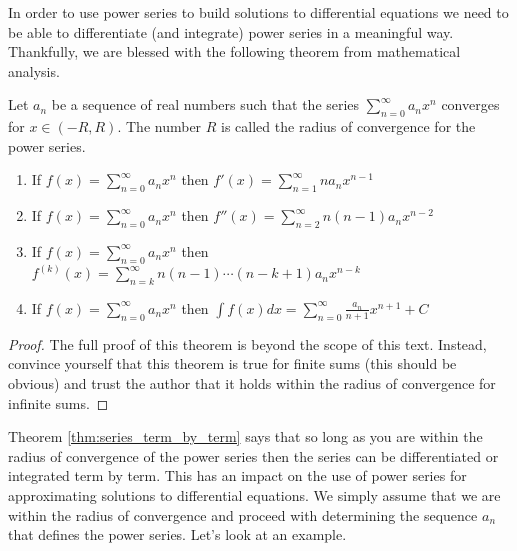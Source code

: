 In order to use power series to build solutions to differential equations we need to be
able to differentiate (and integrate) power series in a meaningful way.  Thankfully, we
are blessed with the following theorem from mathematical analysis.
\begin{thm}\label{thm:series_term_by_term}
    Let $a_n$ be a sequence of real numbers such that the series $\sum_{n=0}^\infty a_n
    x^n$ converges for $x \in (-R,R)$.  The number $R$ is called the radius of convergence
    for the power series.  
    \begin{enumerate}
        \item If $f(x) = \sum_{n=0}^\infty a_n x^n$ then $f'(x) = \sum_{n=1}^\infty n a_n
            x^{n-1}$
        \item If $f(x) = \sum_{n=0}^\infty a_n x^n$ then $f''(x) = \sum_{n=2}^\infty
            n(n-1) a_n x^{n-2}$
        \item If  $f(x) = \sum_{n=0}^\infty a_n x^n$ then $f^{(k)}(x) = \sum_{n=k}^\infty
            n(n-1)\cdots(n-k+1) a_n x^{n-k}$
        \item If $f(x) = \sum_{n=0}^\infty a_n x^n$ then $\int f(x) dx = \sum_{n=0}^\infty
            \frac{a_n}{n+1} x^{n+1}+C$
    \end{enumerate}
\end{thm}
\begin{proof}
    The full proof of this theorem is beyond the scope of this text.  Instead,
    convince yourself that this theorem is true for finite sums (this should be obvious)
    and trust the author that it holds within the radius of convergence for infinite sums.
\end{proof}

Theorem \ref{thm:series_term_by_term} says that so long as you are within the
radius of convergence of the power series then the series can be differentiated or
integrated term by term.  This has an impact on the use of power series for approximating
solutions to differential equations.  We simply assume that we are within the radius of
convergence and proceed with determining the sequence $a_n$ that defines the power series.
Let's look at an example.

